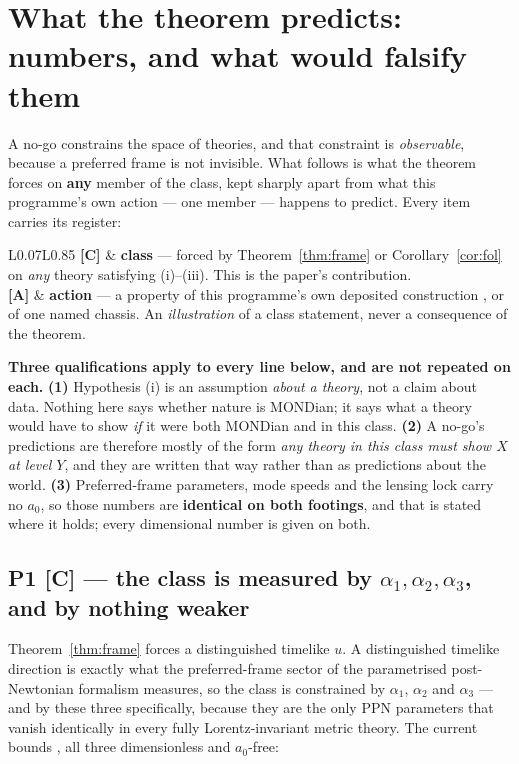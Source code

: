 \documentclass[11pt,letterpaper]{article}
\begin{document}
\section{What the theorem predicts: numbers, and what would falsify them}\label{sec:predictions}

A no-go constrains the space of theories, and that constraint is \emph{observable}, because a preferred frame is not invisible. What follows is what the theorem forces on \textbf{any} member of the class, kept sharply apart from what this programme's own action --- one member --- happens to predict. Every item carries its register:

\begin{center}\small
\begin{tabular}{L{0.07\textwidth}L{0.85\textwidth}}\toprule
\textbf{[C]} & \textbf{class} --- forced by Theorem~\ref{thm:frame} or Corollary~\ref{cor:fol} on \emph{any} theory satisfying (i)--(iii). This is the paper's contribution.\\
\textbf{[A]} & \textbf{action} --- a property of this programme's own deposited construction \cite{Zimmerman2026paper8}, or of one named chassis. An \emph{illustration} of a class statement, never a consequence of the theorem.\\\bottomrule
\end{tabular}
\end{center}

\textbf{Three qualifications apply to every line below, and are not repeated on each.} \textbf{(1)} Hypothesis (i) is an assumption \emph{about a theory}, not a claim about data. Nothing here says whether nature is MONDian; it says what a theory would have to show \emph{if} it were both MONDian and in this class. \textbf{(2)} A no-go's predictions are therefore mostly of the form \emph{any theory in this class must show $X$ at level $Y$}, and they are written that way rather than as predictions about the world. \textbf{(3)} Preferred-frame parameters, mode speeds and the lensing lock carry no $a_0$, so those numbers are \textbf{identical on both footings}, and that is stated where it holds; every dimensional number is given on both.

\subsection{P1 [C] --- the class is measured by $\alpha_1,\alpha_2,\alpha_3$, and by nothing weaker}

Theorem~\ref{thm:frame} forces a distinguished timelike $u$. A distinguished timelike direction is exactly what the preferred-frame sector of the parametrised post-Newtonian formalism measures, so the class is constrained by $\alpha_1$, $\alpha_2$ and $\alpha_3$ --- and by these three specifically, because they are the only PPN parameters that vanish identically in every fully Lorentz-invariant metric theory. The current bounds \cite{Will2014}, all three dimensionless and $a_0$-free:
\end{document}
